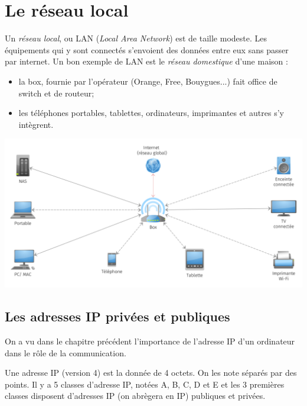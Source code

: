 \chapter{Le réseau local}
Un \textit{réseau local}, ou LAN (\textit{Local Area Network}) est de taille modeste. Les équipements qui y sont connectés s'envoient des données entre eux sans passer par internet. Un bon exemple de LAN est le \textit{réseau domestique} d'une maison :
\begin{itemize}
    \item    la box, fournie par l'opérateur (Orange, Free, Bouygues...) fait office de switch et de routeur;
    \item    les téléphones portables, tablettes, ordinateurs, imprimantes et autres s'y intègrent.
\end{itemize}
\begin{center}
    \includegraphics[width=\textwidth]{ch-reseaulocal/img/reseau_local.png}
\end{center}

\section{Les adresses IP privées et publiques}
On a vu dans le chapitre précédent l'importance de l'adresse IP d'un ordinateur dans le rôle de la communication.

\begin{definition}
    Une adresse IP (version 4) est la donnée de 4 octets. On les note séparés par des points. Il y a 5 classes d'adresse IP, notées A, B, C, D et E et les 3 premières classes disposent d'adresses IP (on abrègera en IP) publiques et privées.
\end{definition}

